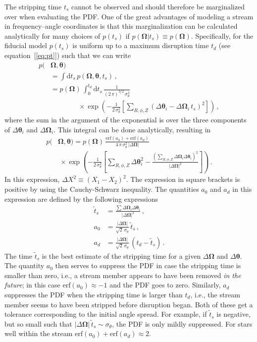 \documentclass{emulateapj}
\newcommand{\ie}{i.e.}
\newcommand{\dd}{\mathrm{d}}
\newcommand{\eqnname}{equation}
\newcommand{\equationname}{\eqnname}
\renewcommand{\vec}[1]{\ensuremath{\mathbf{#1}}}
\newcommand{\veco}{\ensuremath{\vec{\Omega}}}
\newcommand{\veca}{\ensuremath{\boldsymbol\theta}}
\begin{document}
The stripping time $t_s$ cannot be observed and should therefore be
marginalized over when evaluating the PDF. One of the great advantages
of modeling a stream in frequency--angle coordinates is that this
marginalization can be calculated analytically for many choices of
$p(t_s)$ if $p(\veco|t_s) \equiv p(\veco)$. Specifically, for the
fiducial model $p(t_s)$ is uniform up to a maximum disruption time
$t_d$ (see \equationname~[\ref{eq:pt}]) such that we can write
\begin{equation}
\begin{split}
  p(& \veco,\veca)\\
  & = \int \dd t_s\,p(\veco,\veca,t_s)\,,\\
  & = p(\veco)\,\int_0^{t_d} \dd t_s\,
  \frac{1}{(2\,\pi)^{3/2}\,\sigma_\theta^3}\\
  & \qquad \qquad \times\exp\left(-\frac{1}{2\,\sigma_\theta^2}\left[\sum_{R,\phi,Z}\left(\Delta \veca_i-\Delta \veco_i\,t_s\right)^2\right]\right)\,,
\end{split}
\end{equation}
where the sum in the argument of the exponential is over the three
components of $\Delta \veca_i$ and $\Delta \veco_i$. This integral can
be done analytically, resulting in
\begin{equation}\label{eq:pdf}
\begin{split}
  p(& \veco,\veca)  = 
  p(\veco) \,  \frac{\mathrm{erf}(a_0) + \mathrm{erf}(a_d)}{4\,\pi\,\sigma_\theta^2\,|\Delta \veco|}\\
  & \ \times \exp\left(-\frac{1}{2\,\sigma_\theta^2}\left[\sum_{R,\phi,Z}\Delta \veca^2_i-\frac{\left(\sum_{R,\phi,Z} \Delta \veco_i\Delta \veca_i\right)^2}{|\Delta \veco|^2}\right]\right)\,.
\end{split}
\end{equation}
In this expression, $\Delta X^2 \equiv (X_1-X_2)^2$. The expression in
square brackets is positive by using the Cauchy-Schwarz
inequality. The quantities $a_0$ and $a_d$ in this expression are
defined by the following expressions
\begin{align}
  \tilde{t}_s & = \frac{\sum \Delta \veco_i\Delta \veca_i}{|\Delta \veco|^2}\,,\\
  a_0 & = \frac{|\Delta \veco|}{\sqrt{2}\,\sigma_\theta}\,\tilde{t}_s\,,\\
  a_d & = \frac{|\Delta \veco|}{\sqrt{2}\,\sigma_\theta}\,\left(t_d - \tilde{t}_s\right)\,.
\end{align}
The time $\tilde{t}_s$ is the best estimate of the stripping time for
a given $\Delta \veco$ and $\Delta \veca$. The quantity $a_0$ then
serves to suppress the PDF in case the stripping time is smaller than
zero, \ie, a stream member appears to have been removed \emph{in the
  future}; in this case $\mathrm{erf}(a_0) \approx -1$ and the PDF
goes to zero. Similarly, $a_d$ suppresses the PDF when the stripping
time is larger than $t_d$, \ie, the stream member seems to have been
stripped before disruption began. Both of these get a tolerance
corresponding to the initial angle spread. For example, if
$\tilde{t}_s$ is negative, but so small such that $|\Delta
\veco|\,\tilde{t}_s \sim \sigma_\theta$, the PDF is only mildly
suppressed. For stars well within the stream $\mathrm{erf}(a_0) +
\mathrm{erf}(a_d) \approx 2$.
\end{document}
